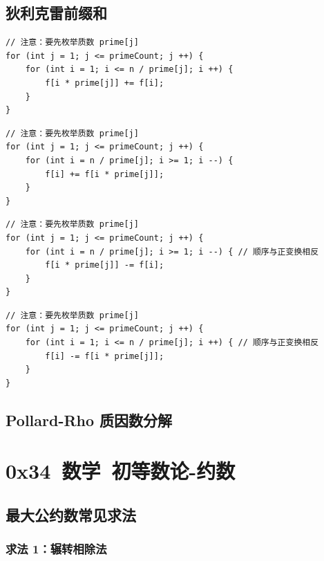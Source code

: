 \documentclass{article}
\begin{document}
\subsection{狄利克雷前缀和}

\begin{verbatim}
// 注意：要先枚举质数 prime[j]
for (int j = 1; j <= primeCount; j ++) {
    for (int i = 1; i <= n / prime[j]; i ++) {
        f[i * prime[j]] += f[i];
    }
}
\end{verbatim}

\begin{verbatim}
// 注意：要先枚举质数 prime[j]
for (int j = 1; j <= primeCount; j ++) {
    for (int i = n / prime[j]; i >= 1; i --) {
        f[i] += f[i * prime[j]];
    }
}
\end{verbatim}

\begin{verbatim}
// 注意：要先枚举质数 prime[j]
for (int j = 1; j <= primeCount; j ++) {
    for (int i = n / prime[j]; i >= 1; i --) { // 顺序与正变换相反
        f[i * prime[j]] -= f[i];
    }
}
\end{verbatim}

\begin{verbatim}
// 注意：要先枚举质数 prime[j]
for (int j = 1; j <= primeCount; j ++) {
    for (int i = 1; i <= n / prime[j]; i ++) { // 顺序与正变换相反
        f[i] -= f[i * prime[j]];
    }
}
\end{verbatim}

\subsection{Pollard-Rho 质因数分解}


\section{0x34\ 数学\ 初等数论-约数}

\subsection{最大公约数常见求法}

\subsubsection{求法 1：辗转相除法}
\end{document}
